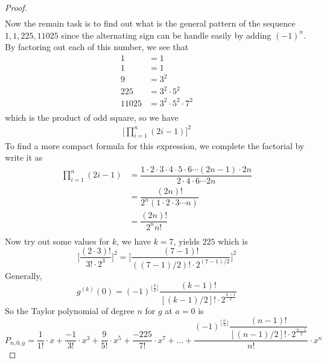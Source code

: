 \documentclass[10pt,letterpaper]{article}
\begin{document}
\begin{enumerate}[(a)]
\begin{proof}
\begin{align*}
	\end{align*}
	Now the remain task is to find out what is the general pattern of the sequence $1, 1, 225, 11025$ since the 
	alternating sign can be handle easily by adding $(-1)^n$. By factoring out each of this number, we see that
	\begin{align*}
		1     &= 1 \\
		1     &= 1 \\
		9     &= 3^2 \\
		225   &= 3^2 \cdot 5^2 \\
		11025 &= 3^2 \cdot 5^2 \cdot 7^2 \\
	\end{align*}
	which is the product of odd square, so we have
	\begin{align*}
		\bigg[\displaystyle\prod_{i=1}^{n}(2i - 1)\bigg]^2
	\end{align*}
	To find a more compact formula for this expression, we complete the factorial by write it as
	\begin{align*}
		\displaystyle\prod_{i=1}^{n}(2i - 1)
		&= \dfrac{1 \cdot 2 \cdot 3 \cdot 4 \cdot 5 \cdot 6 \cdots (2n - 1) \cdot 2n}{2 \cdot 4 \cdot 6 \cdots 2n} \\
		&= \dfrac{(2n)!}{2^n(1 \cdot 2 \cdot 3 \cdots n)} \\
		&= \dfrac{(2n)!}{2^nn!} \\
	\end{align*}
	Now try out some values for $k$, we have $k = 7$, yields $225$ which is
	$$\bigg[\dfrac{(2 \cdot 3)!}{3! \cdot 2^3}\bigg]^2
	= \bigg[\dfrac{(7 - 1)!}{((7 - 1)/2)! \cdot 2^{(7 - 1)/2}}\bigg]^2$$
	Generally,
	$$g^{(k)}(0) = (-1)^{\lfloor \frac{k}{2} \rfloor}\dfrac{(k - 1)!}{[(k - 1)/2]! \cdot 2^{\frac{k - 1}{2}}}$$	
	So the Taylor polynomial of degree $n$ for $g$ at $a = 0$ is
$$
P_{n,0,g}= 
\dfrac{1}{1!} \cdot x +
\dfrac{-1}{3!} \cdot x^3 +
\dfrac{9}{5!} \cdot x^5 +
\dfrac{-225}{7!} \cdot x^7 + 
\ldots + 
\dfrac{(-1)^{\lfloor \frac{n}{2} \rfloor}\dfrac{(n - 1)!}{[(n - 1)/2]! \cdot 2^{\frac{n - 1}{2}}}}{n!} \cdot x^n
$$
	
	
	
	\end{proof}
	
	\end{enumerate}
	
	
\end{document}
